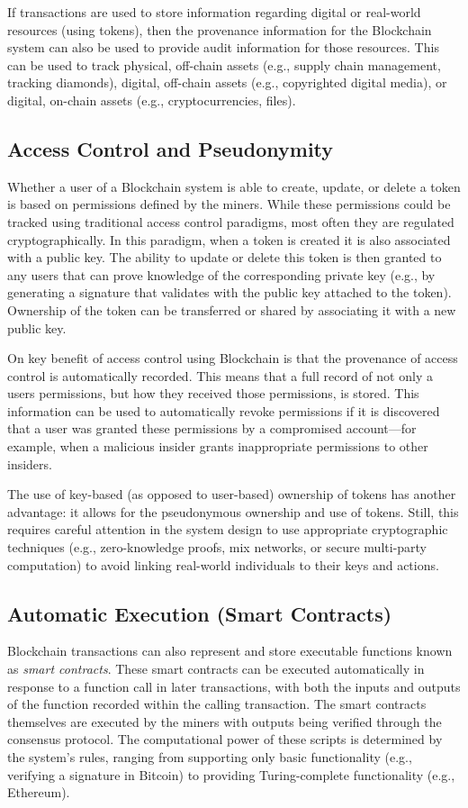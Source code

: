 If transactions are used to store information regarding digital or real-world resources (using tokens), then the provenance information for the Blockchain system can also be used to provide audit information for those resources.
This can be used to track physical, off-chain assets (e.g., supply chain management, tracking diamonds), digital, off-chain assets (e.g., copyrighted digital media), or digital, on-chain assets (e.g., cryptocurrencies, files).
 
\subsection{Access Control and Pseudonymity}
Whether a user of a Blockchain system is able to create, update, or delete a token is based on permissions defined by the miners.
While these permissions could be tracked using traditional access control paradigms, most often they are regulated cryptographically.
In this paradigm, when a token is created it is also associated with a public key.
The ability to update or delete this token is then granted to any users that can prove knowledge of the corresponding private key (e.g., by generating a signature that validates with the public key attached to the token).
Ownership of the token can be transferred or shared by associating it with a new public key.

On key benefit of access control using Blockchain is that the provenance of access control is automatically recorded.
This means that a full record of not only a users permissions, but how they received those permissions, is stored.
This information can be used to automatically revoke permissions if it is discovered that a user was granted these permissions by a compromised account---for example, when a malicious insider grants inappropriate permissions to other insiders.

The use of key-based (as opposed to user-based) ownership of tokens has another advantage: it allows for the pseudonymous ownership and use of tokens.
Still, this requires careful attention in the system design to use appropriate cryptographic techniques (e.g., zero-knowledge proofs, mix networks, or secure multi-party computation) to avoid linking real-world individuals to their keys and actions.

\subsection{Automatic Execution (Smart Contracts)}
Blockchain transactions can also represent and store executable functions known as \emph{smart contracts}.
These smart contracts can be executed automatically in response to a function call in later transactions, with both the inputs and outputs of the function recorded within the calling transaction.
The smart contracts themselves are executed by the miners with outputs being verified through the consensus protocol.
The computational power of these scripts is determined by the system's rules, ranging from supporting only basic functionality (e.g., verifying a signature in Bitcoin) to providing Turing-complete functionality (e.g., Ethereum).

